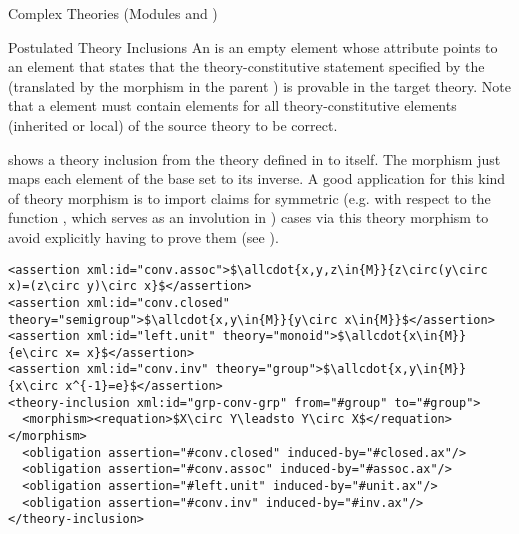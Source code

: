 \begin{tchapter}[id=complex-theories,short=Complex Theories]{Complex Theories (Modules
    {} and {})}
\begin{tsection}[id=theory-inclusions]{Postulated Theory Inclusions}
  An {} is an empty element whose {}
  attribute points to an {} element that states that the
  theory-constitutive statement specified by the {}
  (translated by the morphism in the parent {}) is provable in
  the target theory. Note that a {} element must contain
  {} elements for all theory-constitutive elements (inherited or
  local) of the source theory to be correct.

{} shows a theory inclusion from the theory
{} defined in {} to itself. The morphism just
maps each element of the base set to its inverse. A good application for this kind
of theory morphism is to import claims for symmetric (e.g. with respect to the
function {}, which serves as an involution in {})
cases via this theory morphism to avoid explicitly having to prove them (see
{}).

\begin{lstlisting}[label=lst:theory-inclusion,mathescape,
  caption={A Theory Inclusion for Groups},
  index={theory-inclusion,morphism,requation,assertion}]
<assertion xml:id="conv.assoc">$\allcdot{x,y,z\in{M}}{z\circ(y\circ x)=(z\circ y)\circ x}$</assertion>
<assertion xml:id="conv.closed" theory="semigroup">$\allcdot{x,y\in{M}}{y\circ x\in{M}}$</assertion>
<assertion xml:id="left.unit" theory="monoid">$\allcdot{x\in{M}}{e\circ x= x}$</assertion>
<assertion xml:id="conv.inv" theory="group">$\allcdot{x,y\in{M}}{x\circ x^{-1}=e}$</assertion>
<theory-inclusion xml:id="grp-conv-grp" from="#group" to="#group">
  <morphism><requation>$X\circ Y\leadsto Y\circ X$</requation></morphism>
  <obligation assertion="#conv.closed" induced-by="#closed.ax"/>
  <obligation assertion="#conv.assoc" induced-by="#assoc.ax"/>
  <obligation assertion="#left.unit" induced-by="#unit.ax"/>
  <obligation assertion="#conv.inv" induced-by="#inv.ax"/>
</theory-inclusion>  
\end{lstlisting}
\end{tsection}


\end{tchapter}
